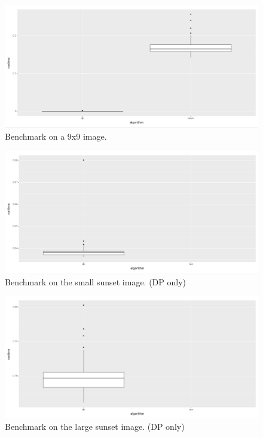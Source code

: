 \documentclass[12pt,letterpaper]{article}
\begin{document}
\begin{figure}[!h]
  \centering
  \includegraphics[width=1.0\linewidth]{benchmark_9x9.jpg}
  \caption{Benchmark on a 9x9 image.}
  \end{figure}

\newpage

\begin{figure}[!h]
  \centering
  \includegraphics[width=1.0\linewidth]{benchmark_sunset_small.jpg}
  \caption{Benchmark on the small sunset image. (DP only)}
  \end{figure}

\begin{figure}[!h]
  \centering
  \includegraphics[width=1.0\linewidth]{benchmark_sunset_large.jpg}
  \caption{Benchmark on the large sunset image. (DP only)}
  \end{figure}
\end{document}
